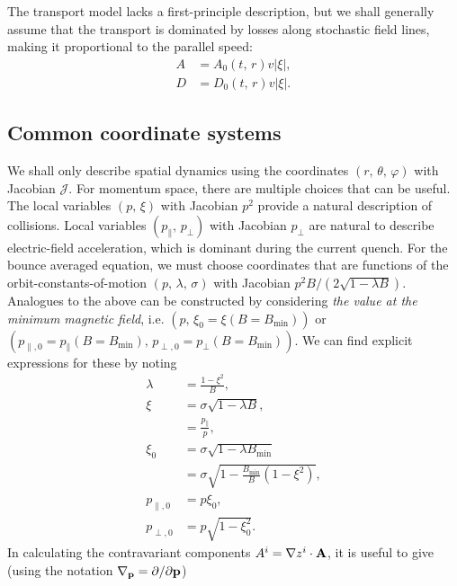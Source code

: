 \documentclass[11pt,a4paper]{article}
\newcommand{\sub}[1]{\ensuremath{_{\text{#1}}}}
\renewcommand{\b}[1]{\ensuremath{ {\bf #1 } }}
\begin{document}
The transport model lacks a first-principle description, but we shall generally assume that the transport is dominated by losses along stochastic field lines, making it proportional to the parallel speed:
\begin{align}
A &= A_0(t,\,r)v |\xi|, \nonumber \\
D &= D_0(t,\,r) v|\xi|.
\end{align}


\subsection{Common coordinate systems}
We shall only describe spatial dynamics using the coordinates $(r,\,\theta,\,\varphi)$ with Jacobian $\mathcal{J}$. For momentum space, there are multiple choices that can be useful. The local variables $(p,\,\xi)$ with Jacobian $p^2$ provide a natural description of collisions. Local variables $(p_\parallel,\,p_\perp)$ with Jacobian $p_\perp$ are natural to describe electric-field acceleration, which is dominant during the current quench. For the bounce averaged equation, we must choose coordinates that are functions of the orbit-constants-of-motion $(p,\,\lambda,\,\sigma)$ with Jacobian $p^2B/(2\sqrt{1-\lambda B})$. Analogues to the above can be constructed by considering \emph{the value at the minimum magnetic field}, i.e. $(p,\,\xi_0 = \xi(B=B\sub{min}))$ or $(p_{\parallel,0} = p_\parallel(B=B\sub{min}),\,p_{\perp,0} = p_\perp(B=B\sub{min}))$. We can find explicit expressions for these by noting
\begin{align}
\lambda &= \frac{1-\xi^2}{B}, \nonumber \\
\xi &= \sigma \sqrt{1-\lambda B}, \nonumber \\
&= \frac{p_\parallel}{p}, \nonumber\\
\xi_0 &= \sigma \sqrt{1-\lambda B\sub{min}}\nonumber \\
&= \sigma \sqrt{1-\frac{B\sub{min}}{B}(1-\xi^2)}, \nonumber \\
p_{\parallel,0} &= p\xi_0, \nonumber \\
p_{\perp,0} &= p\sqrt{1-\xi_0^2}.
\end{align}
In calculating the contravariant components $A^i = \nabla z^i \cdot \b{A}$, it is useful to give (using the notation $\nabla_\b{p} = \partial/\partial \b{p}$)
\end{document}
